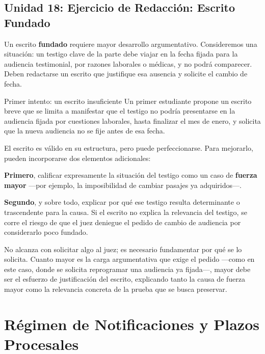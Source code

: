 \documentclass[12pt,oneside]{book}
\begin{document}
\section{Unidad 18: Ejercicio de Redacción: Escrito Fundado}

Un escrito \textbf{fundado} requiere mayor desarrollo argumentativo. Consideremos una situación: un testigo clave de la parte debe viajar en la fecha fijada para la audiencia testimonial, por razones laborales o médicas, y no podrá comparecer. Deben redactarse un escrito que justifique esa ausencia y solicite el cambio de fecha.

\begin{example}{Primer intento: un escrito insuficiente}
Un primer estudiante propone un escrito breve que se limita a manifestar que el testigo no podría presentarse en la audiencia fijada por cuestiones laborales, hasta finalizar el mes de enero, y solicita que la nueva audiencia no se fije antes de esa fecha.
\end{example}

El escrito es válido en su estructura, pero puede perfeccionarse. Para mejorarlo, pueden incorporarse dos elementos adicionales:

\textbf{Primero}, calificar expresamente la situación del testigo como un caso de \textbf{fuerza mayor} ---por ejemplo, la imposibilidad de cambiar pasajes ya adquiridos---.

\textbf{Segundo}, y sobre todo, explicar por qué ese testigo resulta determinante o trascendente para la causa. Si el escrito no explica la relevancia del testigo, se corre el riesgo de que el juez deniegue el pedido de cambio de audiencia por considerarlo poco fundado.

\begin{important}
No alcanza con solicitar algo al juez; es necesario fundamentar por qué se lo solicita. Cuanto mayor es la carga argumentativa que exige el pedido ---como en este caso, donde se solicita reprogramar una audiencia ya fijada---, mayor debe ser el esfuerzo de justificación del escrito, explicando tanto la causa de fuerza mayor como la relevancia concreta de la prueba que se busca preservar.
\end{important}


\chapter{Régimen de Notificaciones y Plazos Procesales}
\end{document}
